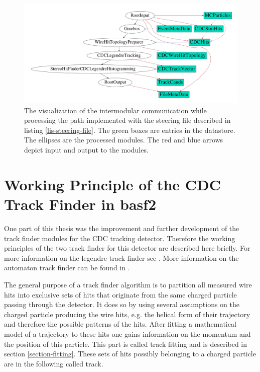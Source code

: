 \begin{figure}
 \centering
 \includegraphics[width=\linewidth]{figures/theory/dataflow.pdf}
 \caption[Visualization of intermodular communication.]{The visualization of the intermodular communication while processing the path implemented with the steering file described in listing \ref{lis-steering-file}. The green boxes are entries in the datastore. The ellipses are the processed modules. The red and blue arrows depict input and output to the modules.}
 \label{fig-viz-datastore}
\end{figure}


\section{Working Principle of the CDC Track Finder in basf2}

One part of this thesis was the improvement and further development of the track finder modules for the CDC tracking detector. Therefore the working principles of the two track finder for this detector are described here briefly. For more information on the legendre track finder see \cite{kronenbitter}. More information on the automaton track finder can be found in \cite{oliver}.

The general purpose of a track finder algorithm is to partition all measured wire hits into exclusive sets of hits that originate from the same charged particle passing through the detector. It does so by using several assumptions on the charged particle producing the wire hits, e.g. the helical form of their trajectory and therefore the possible patterns of the hits. After fitting a mathematical model of a trajectory to these hits one gains information on the momentum and the position of this particle. This part is called track fitting and is described in section \ref{section-fitting}. These sets of hits possibly belonging to a charged particle are in the following called track.

